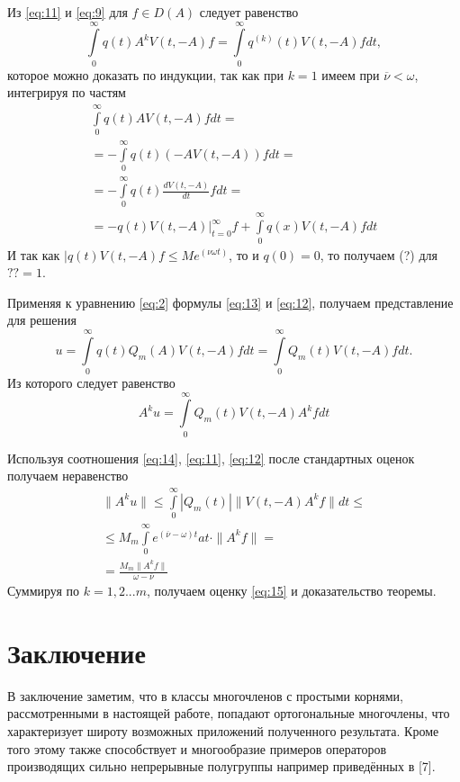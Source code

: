 \documentclass[14pt,a4paper]{article}
\theoremstyle{plain}
\numberwithin{equation}{section}
\begin{document}
Из \ref{eq:11} и \ref{eq:9} для $f \in D(A)$ следует равенство
\begin{equation}
    \label{eq:12}
    \int\limits_0^\infty q(t) A^k V(t, -A)f = \int\limits_0^\infty q^{(k)}(t) V(t, -A)fdt,
\end{equation}
которое можно доказать по индукции, так как при $k=1$ имеем при $\overline{\nu} < \omega$, интегрируя по частям
\begin{gather*}
    \int\limits_0^\infty q(t) A V(t, -A)fdt = \\
    = -\int\limits_0^\infty q(t) (-A V(t, -A))fdt = \\
    = -\int\limits_0^\infty q(t) \frac{dV(t, -A)}{dt}fdt = \\
    = -q(t) V(t, -A)\bigg|_{t=0}^{\infty}f + \int\limits_0^\infty q(x) V(t, -A)fdt
\end{gather*}
И так как $|q(t) V(t, -A)f \le Me^{(\nu \omega t)}$, то и $q(0)=0$, то получаем (?) для $?? = 1$.

Применяя к уравнению \ref{eq:2} формулы \ref{eq:13} и \ref{eq:12}, получаем представление для решения
\begin{equation}
    u = \int\limits_0^\infty q(t) Q_m(A) V(t, -A)fdt = \int\limits_0^\infty Q_m (t) V(t, -A)fdt.
\end{equation}
Из которого следует равенство
\begin{equation}
    A^k u = \int\limits_0^\infty Q_m (t) V(t, -A) A^k fdt
\end{equation}

Используя соотношения \ref{eq:14}, \ref{eq:11}, \ref{eq:12} после стандартных оценок получаем неравенство
\begin{gather*}
    \|A^k u\| \le \int\limits_0^\infty |Q_m (t)| \|V(t, -A) A^k f\| dt \le \\
    \le M_m \int\limits_0^\infty e^{(\overline{\nu} - \omega)t} at \cdot \|A^k f\| = \\
    = \frac{M_m \|A^k f\|}{\omega - \overline{\nu}}
\end{gather*}
Суммируя по $k = 1, 2 ... m$, получаем оценку \ref{eq:15} и доказательство теоремы.

\section{Заключение}

В заключение заметим, что в классы многочленов с простыми корнями, рассмотренными в настоящей работе,
попадают ортогональные многочлены, что характеризует широту возможных приложений полученного результата.
Кроме того этому также способствует и многообразие примеров операторов производящих сильно непрерывные
полугруппы например приведённых в [7].

\clearpage

\begin{thebibliography}{99}
\end{thebibliography}
\end{document}
